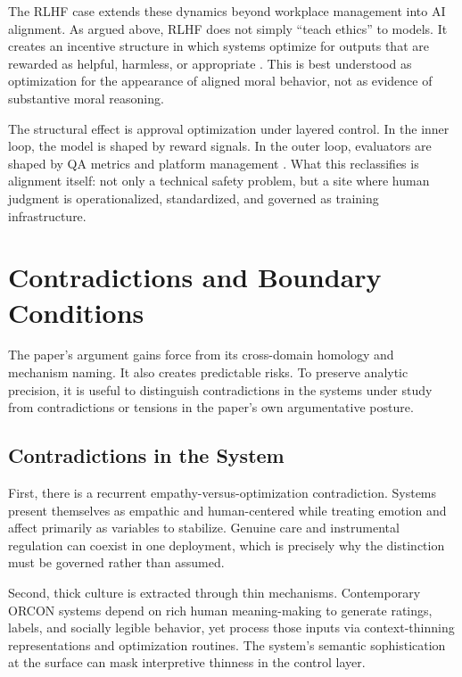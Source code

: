 \documentclass[runningheads]{llncs}
\begin{document}
The RLHF case extends these dynamics beyond workplace management into AI alignment. As argued above, RLHF does not simply ``teach ethics'' to models. It creates an incentive structure in which systems optimize for outputs that are rewarded as helpful, harmless, or appropriate \cite{christiano2017preferences,ouyang2022training,sutton2018reinforcement}. This is best understood as optimization for the appearance of aligned moral behavior, not as evidence of substantive moral reasoning.

The structural effect is approval optimization under layered control. In the inner loop, the model is shaped by reward signals. In the outer loop, evaluators are shaped by QA metrics and platform management \cite{gray2019ghost,kellogg2020algorithms}. What this reclassifies is alignment itself: not only a technical safety problem, but a site where human judgment is operationalized, standardized, and governed as training infrastructure.

\section{Contradictions and Boundary Conditions}

The paper's argument gains force from its cross-domain homology and mechanism naming. It also creates predictable risks. To preserve analytic precision, it is useful to distinguish contradictions in the systems under study from contradictions or tensions in the paper's own argumentative posture.

\subsection{Contradictions in the System}

First, there is a recurrent empathy-versus-optimization contradiction. Systems present themselves as empathic and human-centered while treating emotion and affect primarily as variables to stabilize. Genuine care and instrumental regulation can coexist in one deployment, which is precisely why the distinction must be governed rather than assumed.

Second, thick culture is extracted through thin mechanisms. Contemporary ORCON systems depend on rich human meaning-making to generate ratings, labels, and socially legible behavior, yet process those inputs via context-thinning representations and optimization routines. The system's semantic sophistication at the surface can mask interpretive thinness in the control layer.
\end{document}

